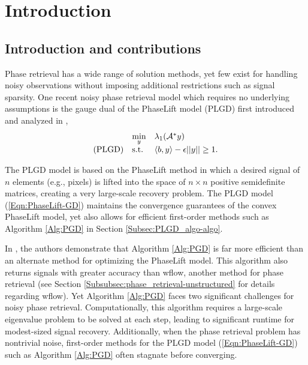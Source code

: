 
\chapter{Introduction}  \label{Sec:Intro}			\label{Sec:intro}



\section{Introduction and contributions} 		\label{Subsec:intro-contributions}

Phase retrieval has a wide range of solution methods, yet few exist for handling noisy observations without imposing additional restrictions such as signal sparsity.  One recent noisy phase retrieval model which requires no underlying assumptions is the gauge dual of the PhaseLift model (PLGD) first introduced and analyzed in \cite{DBLP:journals/siamsc/FriedlanderM16},
\begin{equation} \label{Eqn:PhaseLift-GD}
\begin{array}{lll}
	&	\min\limits_{\substack{y}}
		&	\lambda_1({\mathcal A}^* y)
		\\
\textnormal{(PLGD)}
	&	\textnormal{s.t.}
		&	\langle b, y \rangle - \epsilon ||y|| \geq 1.
\end{array}
\end{equation}

The PLGD model is based on the PhaseLift method \cite{DBLP:journals/siamis/CandesESV13} in which a desired signal of $n$ elements (e.g., pixels) is lifted into the space of $n \times n$ positive semidefinite matrices, creating a very large-scale recovery problem.  The PLGD model (\ref{Eqn:PhaseLift-GD}) maintains the convergence guarantees of the convex PhaseLift model, yet also allows for efficient first-order methods such as Algorithm \ref{Alg:PGD} in Section \ref{Subsec:PLGD_algo-algo}.

In \cite[Section 5]{DBLP:journals/siamsc/FriedlanderM16}, the authors demonstrate that Algorithm \ref{Alg:PGD} is far more efficient than an alternate method for optimizing the PhaseLift model.  This algorithm also returns signals with greater accuracy than wflow, another method for phase retrieval (see Section \ref{Subsubsec:phase_retrieval-unstructured} for details regarding wflow).  Yet Algorithm \ref{Alg:PGD} faces two significant challenges for noisy phase retrieval.  Computationally, this algorithm requires a large-scale eigenvalue problem to be solved at each step, leading to significant runtime for modest-sized signal recovery.  Additionally, when the phase retrieval problem has nontrivial noise, first-order methods for the PLGD model (\ref{Eqn:PhaseLift-GD}) such as Algorithm \ref{Alg:PGD} often stagnate before converging.


